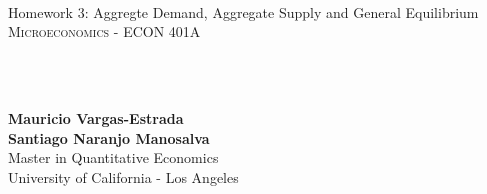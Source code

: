 {
	\parindent0pt
	\ \\ \ \\ \ \\

	\hrulefill
	\vspace{0.0cm}
	\begin{spacing}{2.1}
	{	
		\flushleft
		\fontsize{22pt}{44pt}\selectfont 
		Homework 3: Aggregte Demand, Aggregate Supply and General Equilibrium
	}\\
	\textsc{Microeconomics - ECON 401A}
	\end{spacing}

	\ \\ \ \\
	{
		\textbf{Mauricio Vargas-Estrada}\\
		\textbf{Santiago Naranjo Manosalva}\\
		Master in Quantitative Economics\\
		University of California - Los Angeles\par
	}
	\ \\

	\hrulefill

}
